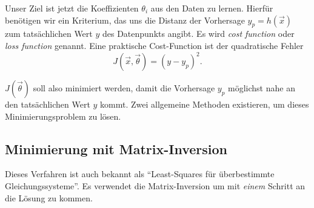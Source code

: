 Unser Ziel ist jetzt die Koeffizienten $\theta_i$ aus den Daten zu lernen. Hierfür
benötigen wir ein Kriterium, das uns die Distanz der Vorhersage $y_p = h(\vec x)$ zum tatsächlichen
Wert $y$ des Datenpunkts angibt. Es wird \emph{cost function} oder
\emph{loss function} genannt. Eine praktische Cost-Function ist der quadratische Fehler
\begin{equation}
J(\vec x, \vec \theta) = (y - y_p)^2.
\label{ml:regression:cost:sqerr}
\end{equation}

$J(\vec \theta)$ soll also minimiert werden, damit die Vorhersage $y_p$ möglichst nahe an den
tatsächlichen Wert $y$ kommt. Zwei allgemeine Methoden existieren, um dieses
Minimierungsproblem zu lösen.

\subsection{Minimierung mit Matrix-Inversion}

Dieses Verfahren ist auch bekannt als ``Least-Squares für überbestimmte
Gleichungssysteme''. Es verwendet die Matrix-Inversion um mit \emph{einem} Schritt an die
Lösung zu kommen.

